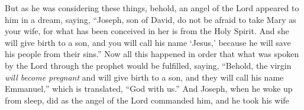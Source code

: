 \begin{biblechapter}
\verse But as he was considering these things, behold, an angel of the Lord appeared to him in a dream, saying, “Joseph, son of David, do not be afraid to take Mary as your wife, for what has been conceived in her is from the Holy Spirit.
\verse And she will give birth to a son, and you will call his name ‘Jesus,’ because he will save his people from their sins.”
\verse Now all this happened in order that what was spoken by the Lord through the prophet would be fulfilled, saying,
\verse “Behold, the virgin \textit{will become pregnant} and will give birth to a son, 
and they will call his name Emmanuel,”
\verse which is translated, “God with us.”
\verse And Joseph, when he woke up from sleep, did as the angel of the Lord commanded him, and he took his wife
\end{biblechapter}

